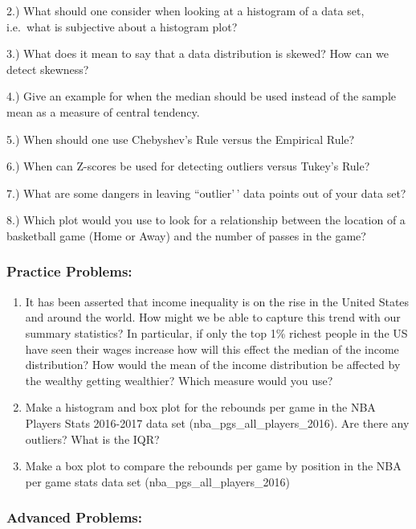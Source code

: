 \documentclass[
]{book}
\theoremstyle{definition}
\theoremstyle{definition}
\theoremstyle{definition}
\theoremstyle{definition}
\theoremstyle{remark}
\begin{document}
2.) What should one consider when looking at a histogram of a data set, i.e.~what is subjective about a histogram plot?

3.) What does it mean to say that a data distribution is skewed? How can we detect skewness?

4.) Give an example for when the median should be used instead of the sample mean as a measure of central tendency.

5.) When should one use Chebyshev's Rule versus the Empirical Rule?

6.) When can Z-scores be used for detecting outliers versus Tukey's Rule?

7.) What are some dangers in leaving ``outlier'\,' data points out of your data set?

8.) Which plot would you use to look for a relationship between the location of a basketball game (Home or Away) and the number of passes in the game?

\hypertarget{practice-problems-1}{%
\subsubsection{Practice Problems:}\label{practice-problems-1}}

\begin{enumerate}
\def\labelenumi{\arabic{enumi}.}
\item
  It has been asserted that income inequality is on the rise in the United States and around the world. How might we be able to capture this trend with our summary statistics? In particular, if only the top 1\% richest people in the US have seen their wages increase how will this effect the median of the income distribution? How would the mean of the income distribution be affected by the wealthy getting wealthier? Which measure would you use?
\item
  Make a histogram and box plot for the rebounds per game in the NBA Players Stats 2016-2017 data set (nba\_pgs\_all\_players\_2016). Are there any outliers? What is the IQR?
\item
  Make a box plot to compare the rebounds per game by position in the NBA per game stats data set (nba\_pgs\_all\_players\_2016)
\end{enumerate}

\hypertarget{advanced-problems-1}{%
\subsubsection{Advanced Problems:}\label{advanced-problems-1}}
\end{document}
